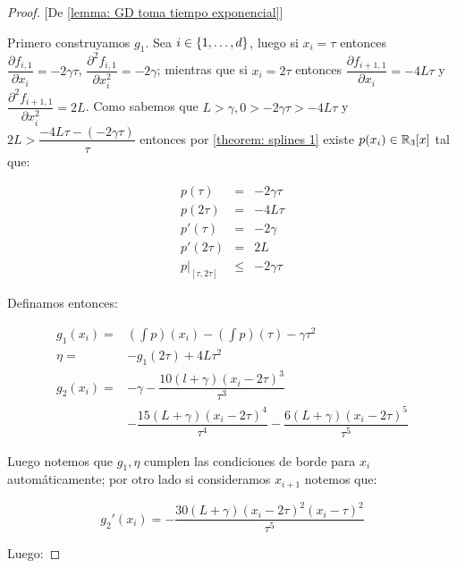 \begin{proof}{[De \ref{lemma: GD toma tiempo exponencial}]}
	
	Primero construyamos $g_1$. Sea $i \in \left\lbrace1, \dots, d\right\rbrace$, luego si $x_i = \tau$ entonces $\dfrac{\partial f_{i,1}}{\partial x_i} = -2\gamma\tau$, $\dfrac{\partial^2 f_{i,1}}{\partial x_i^2} = -2\gamma$; mientras que si $x_i = 2\tau$ entonces $\dfrac{\partial f_{i+1,1}}{\partial x_i} = -4L\tau$ y $\dfrac{\partial^2 f_{i+1,1}}{\partial x_i^2} = 2L$. Como sabemos que $L > \gamma, 0 > -2\gamma\tau > -4L\tau$ y $2L > \dfrac{-4L\tau - \left(-2\gamma \tau\right)}{\tau}$ entonces por \ref{theorem: splines 1} existe $p(x_i) \in {\mathbb{R}}_3[x]$ tal que:
	
	\begin{equation*}
		\begin{aligned}
			p(\tau) & = & -2\gamma \tau \\
			p(2\tau) & = & -4L\tau \\
			p'(\tau) & = & -2\gamma \\
			p'(2\tau) & = & 2L \\
			p \vert_{\left[\tau, 2\tau\right]} & \leq & -2 \gamma \tau
		\end{aligned}
	\end{equation*}
	
	Definamos entonces:
	
	\begin{equation*}
	\begin{array}{ll}
		g_1(x_i) = & \left(\int p\right) (x_i) - \left(\int p\right) (\tau) - \gamma \tau^2 \\
		\eta = & - g_1(2\tau) + 4L \tau^2 \\
		g_2(x_i) = & -\gamma - \dfrac{10 (l+\gamma) \left(x_i - 2\tau\right)^3}{\tau^3} \\ & - \dfrac{15 (L+\gamma)\left(x_i - 2\tau\right)^4}{\tau^4} - \dfrac{6 (L+\gamma)\left(x_i - 2\tau\right)^5}{\tau^5}
	\end{array}
	\end{equation*}
	
	Luego notemos que $g_1, \eta$ cumplen las condiciones de borde para $x_i$ autom\'aticamente; por otro lado si consideramos $x_{i+1}$ notemos que:
	
	\begin{equation*}
		g_2' (x_i) = - \dfrac{30 \left(L+\gamma\right)\left(x_i - 2\tau\right)^2 \left(x_i - \tau\right)^2}{\tau^5}
	\end{equation*}
	
	Luego:
	

\end{proof}
